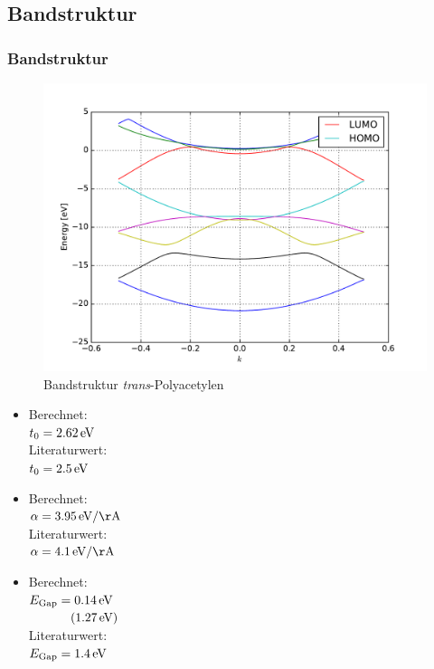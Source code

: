 \subsection{Bandstruktur}
\begin{frame}
\frametitle{Bandstruktur}
\begin{minipage}{0.7\textwidth}
\begin{figure}
	\centering
	\includegraphics[width = \textwidth]{Images/polyacetylene/bands/band_structure}
	\caption{Bandstruktur \emph{trans}-Polyacetylen}
	\label{image_band_structure_relaxed_polyacetylene}
\end{figure}
\end{minipage}
\begin{minipage}{.29\textwidth}
\begin{itemize}
\setlength\itemsep{.2cm}
\item Berechnet:\\
$t_0 = \unit[2.62]{eV}$\\
Literaturwert:\\
$t_0 = \unit[2.5]{eV}$
\item Berechnet:\\
$\alpha = \unit[3.95]{eV/\AA}$\\
Literaturwert:\\
$\alpha = \unit[4.1]{eV/\AA}$
\item Berechnet:\\
$E_\text{Gap} = \unit[0.14]{eV}$\\
$\hspace*{1.15cm}(\unit[1.27]{eV})$\\
Literaturwert:\\
$E_\text{Gap} = \unit[1.4]{eV}$
\end{itemize}
\end{minipage}
\end{frame}

